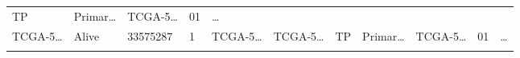 \documentclass[
]{article}
\begin{document}
\begin{longtable}[]{@{}lllllllllll@{}}
\begin{minipage}[t]{0.07\columnwidth}
TP\strut
\end{minipage} & \begin{minipage}[t]{0.07\columnwidth}\raggedright
Primar\ldots{}\strut
\end{minipage} & \begin{minipage}[t]{0.09\columnwidth}\raggedright
TCGA-5\ldots{}\strut
\end{minipage} & \begin{minipage}[t]{0.10\columnwidth}\raggedright
01\strut
\end{minipage} & \begin{minipage}[t]{0.03\columnwidth}\raggedright
\ldots{}\strut
\end{minipage}\tabularnewline
\begin{minipage}[t]{0.07\columnwidth}\raggedright
TCGA-5\ldots{}\strut
\end{minipage} & \begin{minipage}[t]{0.04\columnwidth}\raggedright
Alive\strut
\end{minipage} & \begin{minipage}[t]{0.06\columnwidth}\raggedright
33575287\strut
\end{minipage} & \begin{minipage}[t]{0.07\columnwidth}\raggedright
1\strut
\end{minipage} & \begin{minipage}[t]{0.07\columnwidth}\raggedright
TCGA-5\ldots{}\strut
\end{minipage} & \begin{minipage}[t]{0.07\columnwidth}\raggedright
TCGA-5\ldots{}\strut
\end{minipage} & \begin{minipage}[t]{0.07\columnwidth}\raggedright
TP\strut
\end{minipage} & \begin{minipage}[t]{0.07\columnwidth}\raggedright
Primar\ldots{}\strut
\end{minipage} & \begin{minipage}[t]{0.09\columnwidth}\raggedright
TCGA-5\ldots{}\strut
\end{minipage} & \begin{minipage}[t]{0.10\columnwidth}\raggedright
01\strut
\end{minipage} & \begin{minipage}[t]{0.03\columnwidth}\raggedright
\ldots{}\strut
\end{minipage}\tabularnewline
\begin{minipage}[t]{0.07\columnwidth}\raggedright

\end{minipage}
\end{longtable}
\end{document}
